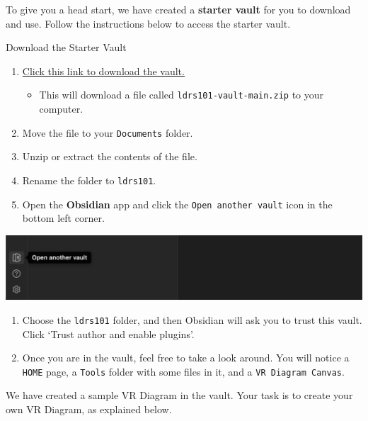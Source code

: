 \documentclass[
]{book}
\providecommand{\tightlist}{%
  \setlength{\itemsep}{0pt}\setlength{\parskip}{0pt}}
\theoremstyle{definition}
\theoremstyle{definition}
\theoremstyle{definition}
\theoremstyle{definition}
\theoremstyle{remark}
\begin{document}
To give you a head start, we have created a \textbf{starter vault} for you to download and use. Follow the instructions below to access the starter vault.

\begin{reflect}
{Download the Starter Vault}

\begin{enumerate}
\def\labelenumi{\arabic{enumi}.}
\tightlist
\item
  \href{https://github.com/twu-innovation/ldrs101-vault/archive/refs/heads/main.zip}{Click this link to download the vault.}

  \begin{itemize}
  \tightlist
  \item
    This will download a file called \texttt{ldrs101-vault-main.zip} to your computer.
  \end{itemize}
\item
  Move the file to your \texttt{Documents} folder.
\item
  Unzip or extract the contents of the file.
\item
  Rename the folder to \texttt{ldrs101}.
\item
  Open the \textbf{Obsidian} app and click the \texttt{Open\ another\ vault} icon in the bottom left corner.
\end{enumerate}

\includegraphics{assets/digital-literacy/obsidian2.png}

\begin{enumerate}
\def\labelenumi{\arabic{enumi}.}
\setcounter{enumi}{5}
\tightlist
\item
  Choose the \texttt{ldrs101} folder, and then Obsidian will ask you to trust this vault. Click `Trust author and enable plugins'.
\item
  Once you are in the vault, feel free to take a look around. You will notice a \texttt{HOME} page, a \texttt{Tools} folder with some files in it, and a \texttt{VR\ Diagram\ Canvas}.
\end{enumerate}

We have created a sample VR Diagram in the vault. Your task is to create your own VR Diagram, as explained below.
\end{reflect}
\end{document}
